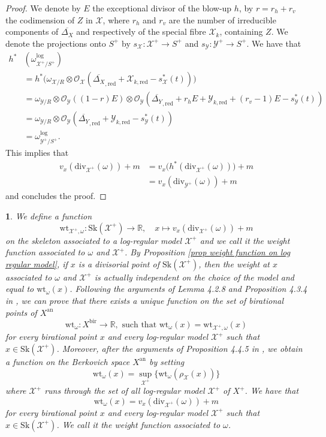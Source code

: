 \documentclass{amsart}%
\numberwithin{equation}{subsection}
\theoremstyle{plain2}
\theoremstyle{definition2}
\theoremstyle{stepstyle}
\theoremstyle{point}
\theoremstyle{subpoint}
\newtheorem{subpoint}[equation]{}%
\newcommand{\spa}[1]{\begin{subpoint}#1\end{subpoint}}           %
\newcommand{\R}{\ensuremath{\mathbb{R}}}
\newcommand{\cX}{\ensuremath{\mathscr{X}}}
\newcommand{\caO}{\ensuremath{\mathcal{O}}}
\newcommand{\cY}{\ensuremath{\mathscr{Y}}}
\renewcommand{\R}{\ensuremath{\mathbb{R}}}
\renewcommand{\cY}{\ensuremath{\mathscr{Y}}}
\newcommand{\redu}{\mathrm{red}}
\newcommand{\an}{\mathrm{an}}
\newcommand{\divisor}{\mathrm{div}}
\newcommand{\weight}{\mathrm{wt}}
\newcommand{\Sk}{\mathrm{Sk}}
\begin{document}
{\begin{proof}
We denote by $E$ the exceptional divisor of the blow-up $h$, by $r=r_h +r_v$ the codimension of $Z$ in $\cX$, where $r_h$ and $r_v$ are the number of irreducible components of $\overline{\Delta_X}$ and respectively of the special fibre $\cX_k$, containing $Z$. We denote the projections onto $S^+$ by $s_{\cX}:\cX^+\rightarrow S^+$ and $s_{\cY}:\cY^+ \rightarrow S^+$. We have that
\begin{align*}
h^*&(\omega^{\log}_{\cX^+/S^+})\\ 
& = h^* \big(\omega_{\cX/R} \otimes \caO_{\cX}(\overline{\Delta_X}_{,\redu} + \cX_{k,\redu} - s_\cX^*(t)) \big) \\
& = \omega_{\cY/R}\otimes \caO_{\cY}((1-r)E) \otimes \caO_{\cY}(\overline{\Delta_Y}_{,\redu} + r_hE+ \cY_{k,\redu} + (r_v-1)E - s_\cY^*(t))\\
& = \omega_{\cY/R} \otimes \caO_{\cY}(\overline{\Delta_Y}_{,\redu} + \cY_{k,\redu} - s_\cY^*(t))\\
& = \omega^{\log}_{\cY^+/S^+}.
\end{align*} This implies that
\begin{align*}
v_x(\divisor_{\cX^+}(\omega)) +m
& = v_x\big(h^*(\divisor_{\cX^+}(\omega))\big) + m \\
& = v_x(\divisor_{\cY^+}(\omega)) +m
\end{align*} and concludes the proof.
\end{proof}
}

\spa{We define a function $$\weight_{\cX^+,\omega}: \Sk(\cX^+) \rightarrow \R, \quad x \mapsto v_x(\divisor_{\cX^+}(\omega)) +m$$ on the skeleton associated to a log-regular model $\cX^+$ and we call it the weight function associated to $\omega$ and $\cX^+$. By Proposition \ref{prop weight function on log regular model}, if $x$ is a divisorial point of $\Sk(\cX^+)$, then the weight at $x$ associated to $\omega$ and $\cX^+$ is actually independent on the choice of the model and equal to $\weight_{\omega}(x)$. Following the arguments of Lemma 4.2.8 and Proposition 4.3.4 in \cite{MustataNicaise}, we can prove that there exists a unique function on the set of birational points of $X^\an$ $$\weight_{\omega}: X^{\text{bir}} \rightarrow \R, \text{ such that }\weight_{\omega}(x)= \weight_{\cX^+,\omega}(x)$$ for every birational point $x$ and every log-regular model $\cX^+$ such that $x \in \Sk(\cX^+)$. Moreover, after the arguments of Proposition 4.4.5 in \cite{MustataNicaise}, we obtain a function on the Berkovich space $X^\an$ by setting $$\weight_{\omega}(x) = \sup_{\cX^+} \{ \weight_{\omega}(\rho_\cX (x))\}$$ where $\cX^+$ runs through the set of all log-regular model $\cX^+$ of $X^+$. We have that \begin{equation} \label{equ:weight function formula} \weight_{\omega}(x)=v_x(\divisor_{\cX^+}(\omega)) +m
\end{equation}for every birational point $x$ and every log-regular model $\cX^+$ such that $x \in \Sk(\cX^+)$. We call it the weight function associated to $\omega$.}
\end{document}
